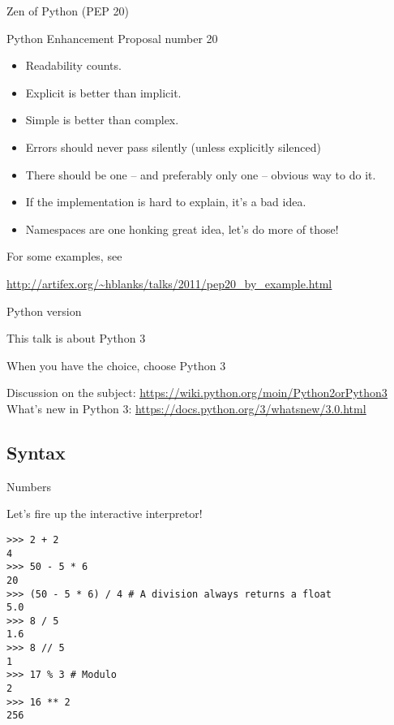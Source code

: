 \documentclass[ignorenonframetext,]{beamer}
\newcommand{\myurl}[1]{\textcolor{blue}{\underline{\url{#1}}}}
\begin{document}
\begin{frame}{Zen of Python (PEP 20)}

    Python Enhancement Proposal number 20

    \begin{itemize}[<+-| alert@+>]
        \item Readability counts.
        \item Explicit is better than implicit.
        \item Simple is better than complex.
        \item Errors should never pass silently (unless explicitly silenced)
        \item There should be one -- and preferably only one -- obvious way to do it.
        \item If the implementation is hard to explain, it's a bad idea.
        \item Namespaces are one honking great idea, let's do more of those!
    \end{itemize}
\end{frame}

\begin{frame}%

    For some examples, see

    \myurl{http://artifex.org/~hblanks/talks/2011/pep20_by_example.html}

\end{frame}

\begin{frame}{Python version}

    This talk is about {\LARGE Python} {\Huge 3}

    When you have the choice, choose Python 3

    Discussion on the subject: \myurl{https://wiki.python.org/moin/Python2orPython3}\\

    What's new in Python 3: \myurl{https://docs.python.org/3/whatsnew/3.0.html}

\end{frame}

\subsection{Syntax}

\begin{frame}[fragile]{Numbers}

    Let's fire up the interactive interpretor!

    \begin{verbatim}
>>> 2 + 2
4
>>> 50 - 5 * 6
20
>>> (50 - 5 * 6) / 4 # A division always returns a float
5.0
>>> 8 / 5
1.6
>>> 8 // 5
1
>>> 17 % 3 # Modulo
2
>>> 16 ** 2
256
    \end{verbatim}
\end{frame}
\end{document}
